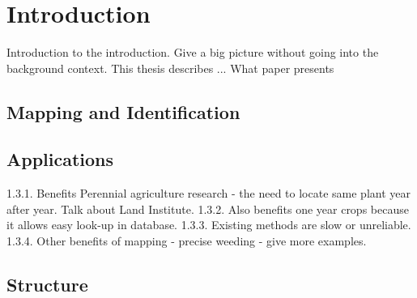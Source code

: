 
\cleardoublepage

\chapter{Introduction}
\label{introduction}

Introduction to the introduction.  Give a big picture without going into the background context. 
This thesis describes ... 
What paper presents

\section{Mapping and Identification}

\section{Applications}
1.3.1.	Benefits Perennial agriculture research - the need to locate same plant year after year.  Talk about Land Institute.
1.3.2.	Also benefits one year crops because it allows easy look-up in database.  
1.3.3.	Existing methods are slow or unreliable.
1.3.4.	Other benefits of mapping - precise weeding - give more examples.

\section{Structure} 
 
